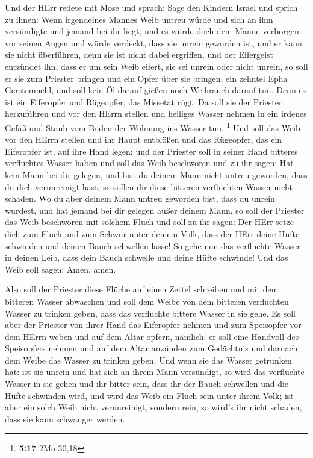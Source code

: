  Und der HErr redete mit Mose und sprach: 
Sage den Kindern Israel und sprich zu ihnen: Wenn irgendeines Mannes
Weib untreu würde und sich an ihm versündigte  und jemand
bei ihr liegt, und es würde doch dem Manne verborgen vor seinen Augen
und würde verdeckt, dass sie unrein geworden ist, und er kann sie nicht
überführen, denn sie ist nicht dabei ergriffen,  und der
Eifergeist entzündet ihn, dass er um sein Weib eifert, sie sei unrein
oder nicht unrein,  so soll er sie zum Priester bringen
und ein Opfer über sie bringen, ein zehntel Epha Gerstenmehl, und soll
kein Öl darauf gießen noch Weihrauch darauf tun. Denn es ist ein
Eiferopfer und Rügeopfer, das Missetat rügt.  Da soll sie
der Priester herzuführen und vor den HErrn stellen  und
heiliges Wasser nehmen in ein irdenes Gefäß und Staub vom Boden der
Wohnung ins Wasser tun. \footnote{\textbf{5:17} 2Mo 30,18}
 Und soll das Weib vor den HErrn stellen und ihr Haupt
entblößen und das Rügeopfer, das ein Eiferopfer ist, auf ihre Hand
legen; und der Priester soll in seiner Hand bitteres verfluchtes Wasser
haben  und soll das Weib beschwören und zu ihr sagen: Hat
kein Mann bei dir gelegen, und bist du deinem Mann nicht untreu
geworden, dass du dich verunreinigt hast, so sollen dir diese bitteren
verfluchten Wasser nicht schaden.  Wo du aber deinem Mann
untreu geworden bist, dass du unrein wurdest, und hat jemand bei dir
gelegen außer deinem Mann,  so soll der Priester das Weib
beschwören mit solchem Fluch und soll zu ihr sagen: Der HErr setze dich
zum Fluch und zum Schwur unter deinem Volk, dass der HErr deine Hüfte
schwinden und deinen Bauch schwellen lasse!  So gehe nun
das verfluchte Wasser in deinen Leib, dass dein Bauch schwelle und deine
Hüfte schwinde! Und das Weib soll sagen: Amen, amen.

 Also soll der Priester diese Flüche auf einen Zettel
schreiben und mit dem bitteren Wasser abwaschen  und soll
dem Weibe von dem bitteren verfluchten Wasser zu trinken geben, dass das
verfluchte bittere Wasser in sie gehe.  Es soll aber der
Priester von ihrer Hand das Eiferopfer nehmen und zum Speisopfer vor dem
HErrn weben und auf dem Altar opfern, nämlich:  er soll
eine Handvoll des Speisopfers nehmen und auf dem Altar anzünden zum
Gedächtnis und darnach dem Weibe das Wasser zu trinken geben.
 Und wenn sie das Wasser getrunken hat: ist sie unrein
und hat sich an ihrem Mann versündigt, so wird das verfluchte Wasser in
sie gehen und ihr bitter sein, dass ihr der Bauch schwellen und die
Hüfte schwinden wird, und wird das Weib ein Fluch sein unter ihrem Volk;
 ist aber ein solch Weib nicht verunreinigt, sondern
rein, so wird's ihr nicht schaden, dass sie kann schwanger werden.

